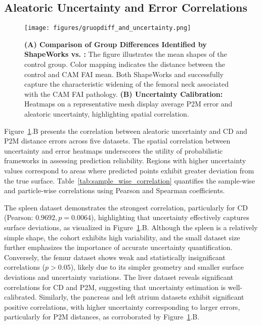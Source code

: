 \subsection{Aleatoric Uncertainty and Error Correlations}
\begin{figure}
    \centering
    \texttt{[image: figures/gruopdiff\_and\_uncertainty.png]}
    \caption{\textbf{(A) Comparison of Group Differences Identified by ShapeWorks vs. \model:} The figure illustrates the mean shapes of the control group. Color mapping indicates the distance between the control and CAM FAI mean. Both ShapeWorks and \model successfully capture the characteristic widening of the femoral neck associated with the CAM FAI pathology. \textbf{(B) Uncertainty Calibration:} Heatmaps on a representative mesh display average P2M error and aleatoric uncertainty, highlighting spatial correlation.}
    \label{fig:group_diff_uncertainity_surface}
\end{figure}
Figure~\ref{fig:group_diff_uncertainity_surface}.B presents the correlation between aleatoric uncertainty and CD and P2M distance errors across five datasets. The spatial correlation between uncertainty and error heatmaps underscores the utility of probabilistic frameworks in assessing prediction reliability. Regions with higher uncertainty values correspond to areas where predicted points exhibit greater deviation from the true surface. Table~\ref{tab:sample_wise_correlation} quantifies the sample-wise and particle-wise correlations using Pearson and Spearman coefficients.

The spleen dataset demonstrates the strongest correlation, particularly for CD (Pearson: \(0.9692, p = 0.0064\)), highlighting that uncertainty effectively captures surface deviations, as visualized in Figure~\ref{fig:group_diff_uncertainity_surface}.B. Although the spleen is a relatively simple shape, the cohort exhibits high variability, and the small dataset size further emphasizes the importance of accurate uncertainty quantification. 
Conversely, the femur dataset shows weak and statistically insignificant correlations (\(p > 0.05\)), likely due to its simpler geometry and smaller surface deviations and uncertainty variations. The liver dataset reveals significant correlations for CD and P2M, suggesting that uncertainty estimation is well-calibrated. Similarly, the pancreas and left atrium datasets exhibit significant positive correlations, with higher uncertainty corresponding to larger errors, particularly for P2M distances, as corroborated by Figure~\ref{fig:group_diff_uncertainity_surface}.B.

